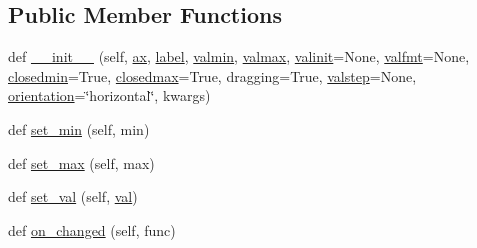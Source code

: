 \subsection*{Public Member Functions}
\begin{DoxyCompactItemize}
\item 
def \hyperlink{classmatplotlib_1_1widgets_1_1RangeSlider_aa02e80e894adeff6d0251821a64e10f2}{\+\_\+\+\_\+init\+\_\+\+\_\+} (self, \hyperlink{classmatplotlib_1_1widgets_1_1AxesWidget_ac0722858b7001d10a42055dc90420b4f}{ax}, \hyperlink{classmatplotlib_1_1widgets_1_1RangeSlider_a14031aac72ac612a9b731dfa5ae9adaf}{label}, \hyperlink{classmatplotlib_1_1widgets_1_1SliderBase_a993fb203f18eed971f45cc5cefe46b75}{valmin}, \hyperlink{classmatplotlib_1_1widgets_1_1SliderBase_a43671ae3d4d11d7b5cc1f057d6906d7d}{valmax}, \hyperlink{classmatplotlib_1_1widgets_1_1RangeSlider_a9c1d5f8fd0a3032655e02f65198455c7}{valinit}=None, \hyperlink{classmatplotlib_1_1widgets_1_1SliderBase_a30eb223d32ca95faa7bd011bb5dc1836}{valfmt}=None, \hyperlink{classmatplotlib_1_1widgets_1_1SliderBase_aaacaef7e24bbf0e58411e11bab0f6251}{closedmin}=True, \hyperlink{classmatplotlib_1_1widgets_1_1SliderBase_a250e05d4e913ab64f1aab8199139121e}{closedmax}=True, dragging=True, \hyperlink{classmatplotlib_1_1widgets_1_1SliderBase_acc8d1e84849e95324ba5261011d7ffdc}{valstep}=None, \hyperlink{classmatplotlib_1_1widgets_1_1RangeSlider_a1f59a8a85f45ba8048209d134b2a4711}{orientation}=\char`\"{}horizontal\char`\"{}, kwargs)
\item 
def \hyperlink{classmatplotlib_1_1widgets_1_1RangeSlider_aa1429e9f0f6f9d87e1e7fcc59061270f}{set\+\_\+min} (self, min)
\item 
def \hyperlink{classmatplotlib_1_1widgets_1_1RangeSlider_a44ca2d8906994e342eb1d0083fa929b7}{set\+\_\+max} (self, max)
\item 
def \hyperlink{classmatplotlib_1_1widgets_1_1RangeSlider_a9d36dcc7c304e7c974435b65a63385da}{set\+\_\+val} (self, \hyperlink{classmatplotlib_1_1widgets_1_1RangeSlider_a70cbec0a637533482703b3acaa6f2aef}{val})
\item 
def \hyperlink{classmatplotlib_1_1widgets_1_1RangeSlider_ab7736352fe5054f2cbdfe4554952446a}{on\+\_\+changed} (self, func)
\end{DoxyCompactItemize}
